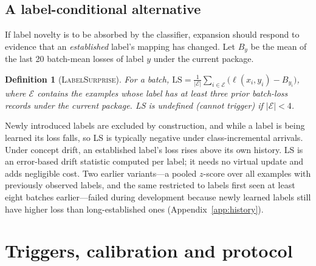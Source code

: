 \documentclass[10pt]{article}
\newtheorem{definition}{Definition}
\newcommand{\ls}{\textsc{LabelSurprise}}
\begin{document}
\subsection{A label-conditional alternative}
\label{sec:surprise}
If label novelty is to be absorbed by the classifier, expansion should respond to evidence that an \emph{established} label's mapping has changed. Let $B_y$ be the mean of the last 20 batch-mean losses of label $y$ under the current package.
\begin{definition}[\ls]
For a batch, $\mathrm{LS} = \frac{1}{|\mathcal{E}|}\sum_{i\in\mathcal{E}} \big(\ell(x_i,y_i) - B_{y_i}\big)$, where $\mathcal{E}$ contains the examples whose label has at least three prior batch-loss records under the current package. LS is undefined (cannot trigger) if $|\mathcal{E}|<4$.
\end{definition}
Newly introduced labels are excluded by construction, and while a label is being learned its loss falls, so LS is typically negative under class-incremental arrivals. Under concept drift, an established label's loss rises above its own history. LS is an error-based drift statistic \citep{gama2004ddm} computed per label; it needs no virtual update and adds negligible cost. Two earlier variants---a pooled $z$-score over all examples with previously observed labels, and the same restricted to labels first seen at least eight batches earlier---failed during development because newly learned labels still have higher loss than long-established ones (Appendix~\ref{app:history}).

\section{Triggers, calibration and protocol}
\label{sec:triggers}
\end{document}
